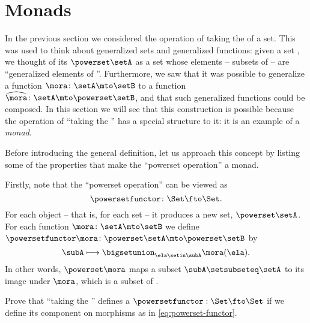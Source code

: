 
\section{Monads}
\label{sec:monads}

In the previous section we considered the operation of taking the  of a set.
This was used to think about generalized sets and generalized functions: given a set \setA, we thought of its  $\powerset \setA$ as a set whose elements -- subsets of \setA -- are ``generalized elements of \setA''.
Furthermore, we saw that it was possible to generalize a function $\mora \colon \setA \mto \setB$ to a function $\widehat \mora \colon  \setA \mto \powerset \setB$, and that such generalized functions could be composed.
In this section we will see that this construction is possible because the operation of ``taking the '' has a special structure to it: it is an example of a \emph{monad}.

Before introducing the general definition, let us approach this concept by listing some of the properties that make the ``powerset operation'' a monad.

Firstly, note that the ``powerset operation'' can be viewed as 
\begin{equation}
    \powersetfunctor\colon \Set \fto \Set.
\end{equation}
For each object -- that is, for each set \setA -- it produces a new set, $\powerset \setA$.
For each function $\mora \colon \setA \mto \setB$ we define $\powersetfunctor \mora \colon \powerset \setA \mto \powerset \setB$ by
\begin{equation}
    \label{eq:powerset-functor}
    \subA \longmapsto \bigsetunion_{\ela \setin \subA} \mora(\ela).
\end{equation}
In other words, $\powerset \mora$ maps a subset $\subA \setsubseteq \setA$ to its image under $\mora$, which is a subset of \setB.

\begin{gradedexercise}
    \label{ex:PowersetImageFunctor}
    Prove that ``taking the '' defines a  $\powersetfunctor : \Set \fto \Set$ if we define its component on morphisms as in \cref{eq:powerset-functor}.
\end{gradedexercise}



